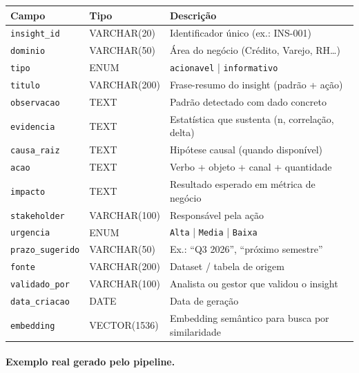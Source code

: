 \begin{BoardBox}[title=Tabela \texttt{insight\_base}]
\small
\begin{tabular}{@{}p{3.2cm}p{2.2cm}p{5.6cm}@{}}
\toprule
\textbf{Campo} & \textbf{Tipo} & \textbf{Descrição} \\
\midrule
\texttt{insight\_id}    & VARCHAR(20)  & Identificador único (ex.: INS-001) \\
\texttt{dominio}        & VARCHAR(50)  & Área do negócio (Crédito, Varejo, RH\ldots) \\
\texttt{tipo}           & ENUM         & \texttt{acionavel} | \texttt{informativo} \\
\texttt{titulo}         & VARCHAR(200) & Frase-resumo do insight (padrão + ação) \\
\texttt{observacao}     & TEXT         & Padrão detectado com dado concreto \\
\texttt{evidencia}      & TEXT         & Estatística que sustenta (n, correlação, delta) \\
\texttt{causa\_raiz}    & TEXT         & Hipótese causal (quando disponível) \\
\texttt{acao}           & TEXT         & Verbo + objeto + canal + quantidade \\
\texttt{impacto}        & TEXT         & Resultado esperado em métrica de negócio \\
\texttt{stakeholder}    & VARCHAR(100) & Responsável pela ação \\
\texttt{urgencia}       & ENUM         & \texttt{Alta} | \texttt{Media} | \texttt{Baixa} \\
\texttt{prazo\_sugerido}& VARCHAR(50)  & Ex.: ``Q3 2026'', ``próximo semestre'' \\
\texttt{fonte}          & VARCHAR(200) & Dataset / tabela de origem \\
\texttt{validado\_por}  & VARCHAR(100) & Analista ou gestor que validou o insight \\
\texttt{data\_criacao}  & DATE         & Data de geração \\
\texttt{embedding}      & VECTOR(1536) & Embedding semântico para busca por similaridade \\
\bottomrule
\end{tabular}
\end{BoardBox}

\paragraph{Exemplo real gerado pelo pipeline.}

